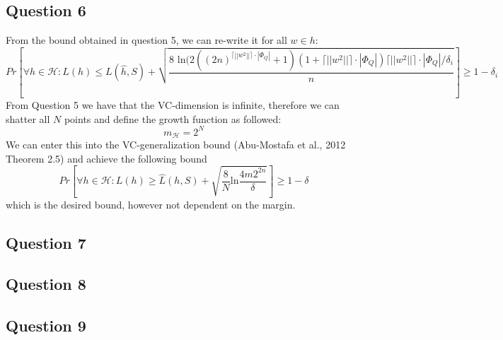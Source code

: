 \documentclass{article}
\begin{document}
\subsection{Question 6}
From the bound obtained in question 5, we can re-write it for all $w \in h$:
\begin{equation}
Pr \left[ \forall h \in \mathcal{H}: L(h) \leq L(\hat{h},S)+
\sqrt{ \dfrac{8 \text{ ln} (2((2n)^{\lceil || w^2|| \rceil \cdot| \Phi_Q|}+1) (1+ \lceil || w^2|| \rceil \cdot| \Phi_Q|) \lceil || w^2|| \rceil \cdot| \Phi_Q|  / \delta_i}{n}} \right] \geq 1- \delta_i 
\end{equation} 
From Question 5 we have that the VC-dimension is infinite, therefore we can shatter all $N$ points and define the growth function as followed:
\begin{equation}
m_\mathcal{H} = 2^N
\end{equation}
We can enter this into the VC-generalization bound (Abu-Mostafa et al., 2012 Theorem 2.5) and achieve the following bound
\begin{equation}
Pr \left[ \forall h \in \mathcal{H}: L(h) \geq \hat{L}(h,S) +
\sqrt{\dfrac{8}{N}\text{ln} \dfrac{4m 2^{2n}}{\delta}} \right] \geq 1-\delta
\end{equation}
which is the desired bound, however not dependent on the margin.
\subsection{Question 7}

\subsection{Question 8}

\subsection{Question 9}
\end{document}
